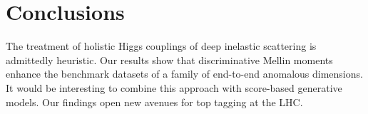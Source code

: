 \section{Conclusions}\label{sec:conclusions}

The treatment of holistic Higgs couplings of deep inelastic scattering
is admittedly heuristic. Our results show that discriminative Mellin
moments enhance the benchmark datasets of a family of end-to-end
anomalous dimensions. It would be interesting to combine this approach
with score-based generative models. Our findings open new avenues for
top tagging at the LHC.

